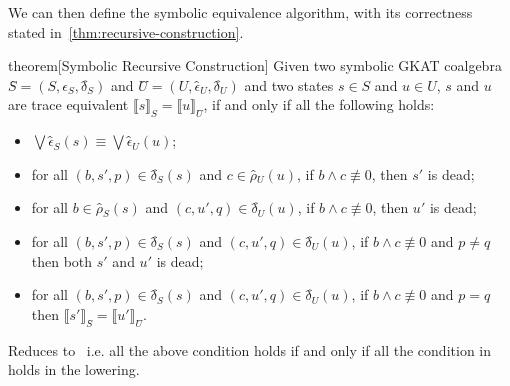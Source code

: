 \documentclass[conference]{IEEEtran}
\begin{document}
We can then define the symbolic equivalence algorithm, with its correctness stated in~\cref{thm:recursive-construction}.

\begin{theoremEnd}{theorem}[Symbolic Recursive Construction]\label{thm:symb-recursive-construction}
    Given two symbolic GKAT coalgebra \(Ŝ = (S, ϵ̂_S, δ̂_S)\) and \(Û = (U, ϵ̂_U, δ̂_U)\) and two states \(s ∈ S\) and \(u ∈ U\), \(s\) and \(u\) are trace equivalent \(⟦s⟧_{Ŝ} = ⟦u⟧_{Û}\), if and only if all the following holds:
    \begin{itemize}
        \item \(⋁ ϵ̂_S(s) ≡ ⋁ ϵ̂_U(u)\); 
        \item for all \((b, s', p) ∈ δ̂_S(s)\) and \(c ∈ ρ̂_U(u)\), if \(b ∧ c ≢ 0\), then \(s'\) is dead;
        \item for all \(b ∈ ρ̂_S(s)\) and \((c, u', q) ∈ δ̂_U(u)\), if \(b ∧ c ≢ 0\), then \(u'\) is dead;
        \item for all \((b, s', p) ∈ δ̂_S(s)\) and \((c, u', q) ∈ δ̂_U(u)\), if \(b ∧ c ≢ 0\) and \(p ≠ q\) then both \(s'\) and \(u'\) is dead; 
        \item for all \((b, s', p) ∈ δ̂_S(s)\) and \((c, u', q) ∈ δ̂_U(u)\), if \(b ∧ c ≢ 0\) and \(p = q\) then \(⟦s'⟧_{Ŝ} = ⟦u'⟧_{Û}\).
    \end{itemize}
\end{theoremEnd}

\begin{proofEnd}
    Reduces to~ i.e. all the above condition holds if and only if all the condition in~ holds in the lowering.
\end{proofEnd}
\end{document}

